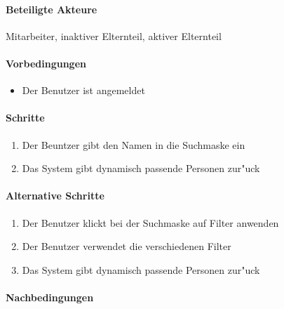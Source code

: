   \paragraph{Beteiligte Akteure}   \leavevmode \newline
    Mitarbeiter, inaktiver Elternteil, aktiver Elternteil
  \paragraph{Vorbedingungen}
  \begin{itemize}
   \item Der Benutzer ist angemeldet
  \end{itemize}

  \paragraph{Schritte}
  \begin{enumerate}
   \item Der Beuntzer gibt den Namen in die Suchmaske ein
   \item Das System gibt dynamisch passende Personen zur"uck
  \end{enumerate}

  \paragraph{Alternative Schritte}
  \begin{enumerate}
   \item Der Benutzer klickt bei der Suchmaske auf \dq Filter anwenden\dq
   \item Der Benutzer verwendet die verschiedenen Filter
   \item Das System gibt dynamisch passende Personen zur"uck
  \end{enumerate}

  \paragraph{Nachbedingungen}
